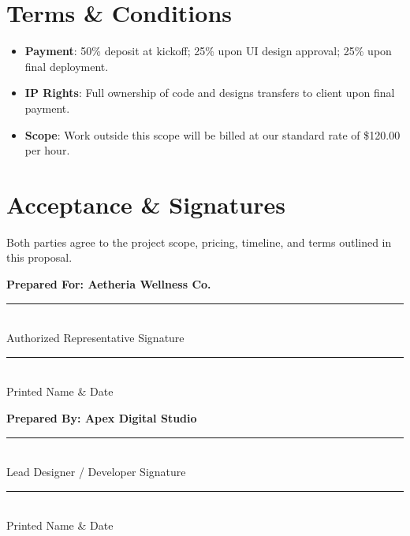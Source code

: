\documentclass[11pt, letterpaper]{article}
\newcommand{\parbreak}{\vspace{1ex}\par}
\begin{document}
\vspace{0.05in}

\section{Terms \& Conditions}
\begin{itemize}
    \item \textbf{Payment}: 50\% deposit at kickoff; 25\% upon UI design approval; 25\% upon final deployment.
    \item \textbf{IP Rights}: Full ownership of code and designs transfers to client upon final payment.
    \item \textbf{Scope}: Work outside this scope will be billed at our standard rate of \$120.00 per hour.
\end{itemize}

\vspace{0.15in}

\section{Acceptance \& Signatures}
Both parties agree to the project scope, pricing, timeline, and terms outlined in this proposal.

\parbreak
\vspace{0.25in}

\begin{minipage}[t]{0.47\linewidth}
    {\color{accent}\bfseries Prepared For: Aetheria Wellness Co.} \\
    \vspace{0.6cm}
    \rule{\linewidth}{0.5pt} \\
    {\small\color{muted} Authorized Representative Signature} \\
    \vspace{0.25cm}
    \rule{\linewidth}{0.5pt} \\
    {\small\color{muted} Printed Name \& Date}
\end{minipage}
\hfill
\begin{minipage}[t]{0.47\linewidth}
    {\color{accent}\bfseries Prepared By: Apex Digital Studio} \\
    \vspace{0.6cm}
    \rule{\linewidth}{0.5pt} \\
    {\small\color{muted} Lead Designer / Developer Signature} \\
    \vspace{0.25cm}
    \rule{\linewidth}{0.5pt} \\
    {\small\color{muted} Printed Name \& Date}
\end{minipage}
\end{document}
